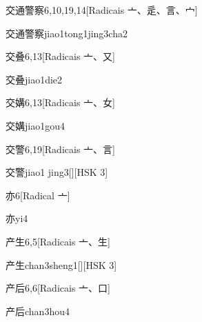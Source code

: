\begin{entry}{交通警察}{6,10,19,14}[Radicais ⼇、⾡、⾔、⼧]
  \begin{phonetics}{交通警察}{jiao1tong1jing3cha2}
  \end{phonetics}
\end{entry}

\begin{entry}{交叠}{6,13}[Radicais ⼇、⼜]
  \begin{phonetics}{交叠}{jiao1die2}
  \end{phonetics}
\end{entry}

\begin{entry}{交媾}{6,13}[Radicais ⼇、⼥]
  \begin{phonetics}{交媾}{jiao1gou4}
  \end{phonetics}
\end{entry}

\begin{entry}{交警}{6,19}[Radicais ⼇、⾔]
  \begin{phonetics}{交警}{jiao1 jing3}[][HSK 3]
  \end{phonetics}
\end{entry}

\begin{entry}{亦}{6}[Radical ⼇]
  \begin{phonetics}{亦}{yi4}
  \end{phonetics}
\end{entry}

\begin{entry}{产生}{6,5}[Radicais ⼇、⽣]
  \begin{phonetics}{产生}{chan3sheng1}[][HSK 3]
  \end{phonetics}
\end{entry}

\begin{entry}{产后}{6,6}[Radicais ⼇、⼝]
  \begin{phonetics}{产后}{chan3hou4}
  \end{phonetics}
\end{entry}

